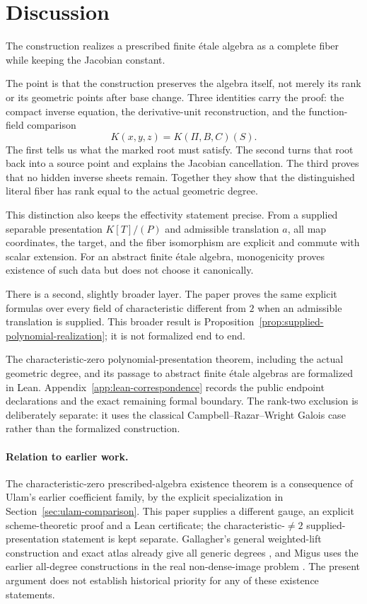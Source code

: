 \section{Discussion}

The construction realizes a prescribed finite \'etale algebra as a
complete fiber while keeping the Jacobian constant.

The point is that the construction preserves the algebra itself, not merely
its rank or its geometric points after base change.  Three identities carry
the proof: the compact inverse equation, the derivative-unit reconstruction,
and the function-field comparison
\[
 K(x,y,z)=K(\Pi,B,C)(S).
\]
The first tells us what the marked root must satisfy.  The second turns that
root back into a source point and explains the Jacobian cancellation.  The
third proves that no hidden inverse sheets remain.  Together they show that
the distinguished literal fiber has rank equal to the actual geometric
degree.

This distinction also keeps the effectivity statement precise.  From a
supplied separable presentation \(K[T]/(P)\) and admissible translation
\(a\), all map coordinates, the target, and the fiber isomorphism are
explicit and commute with scalar extension.  For an abstract finite \'etale
algebra, monogenicity proves existence of such data but does not choose it
canonically.

There is a second, slightly broader layer.  The paper proves the same
explicit formulas over every field of characteristic different from \(2\)
when an admissible translation is supplied.  This broader result is
Proposition~\ref{prop:supplied-polynomial-realization}; it is not formalized
end to end.

The characteristic-zero polynomial-presentation theorem, including the actual
geometric degree, and its passage to abstract finite \'etale algebras are
formalized in Lean.
Appendix~\ref{app:lean-correspondence} records the public endpoint
declarations and the exact remaining formal boundary.  The rank-two exclusion
is deliberately separate: it uses the
classical Campbell--Razar--Wright Galois case rather than the formalized
construction.

\paragraph{Relation to earlier work.}
The characteristic-zero prescribed-algebra existence theorem is a
consequence of Ulam's earlier coefficient family, by the explicit
specialization in Section~\ref{sec:ulam-comparison}. This paper supplies a
different gauge, an explicit scheme-theoretic proof and a Lean certificate;
the characteristic-\(\ne2\) supplied-presentation statement is kept separate.
Gallagher's general weighted-lift construction and exact atlas already give
all generic degrees \cite{GallagherConstruction,Gallagher}, and Migus
uses the earlier all-degree constructions in the real non-dense-image
problem \cite{Migus}. The present argument does not establish historical
priority for any of these existence statements.

